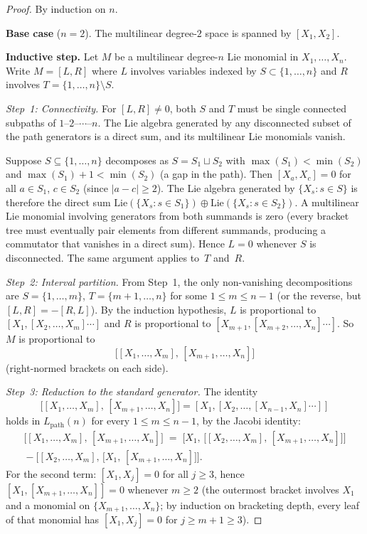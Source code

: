 \begin{proof}
By induction on $n$.

\medskip\noindent\textbf{Base case} ($n=2$).
The multilinear degree-$2$ space is spanned by $[X_1,X_2]$.

\medskip\noindent\textbf{Inductive step.}
Let $M$ be a multilinear degree-$n$ Lie monomial in $X_1,\ldots,X_n$.
Write $M=[L,R]$ where $L$ involves variables indexed by $S\subset
\{1,\ldots,n\}$ and $R$ involves $T=\{1,\ldots,n\}\setminus S$.

\emph{Step~1: Connectivity.}
For $[L,R]\neq 0$, both $S$ and $T$ must be single connected subpaths
of $1\text{--}2\text{--}\cdots\text{--}n$. The Lie algebra generated by
any disconnected subset of the path generators is a direct sum, and its
multilinear Lie monomials vanish.

Suppose $S\subseteq\{1,\ldots,n\}$ decomposes as $S=S_1\sqcup S_2$
with $\max(S_1)<\min(S_2)$ and $\max(S_1)+1<\min(S_2)$ (a gap in the
path). Then $[X_a,X_c]=0$ for all $a\in S_1$, $c\in S_2$ (since
$|a-c|\ge 2$). The Lie algebra generated by $\{X_s:s\in S\}$ is
therefore the direct sum
$\mathrm{Lie}(\{X_s:s\in S_1\})\oplus\mathrm{Lie}(\{X_s:s\in S_2\})$.
A multilinear Lie monomial involving generators from both summands is
zero (every bracket tree must eventually pair elements from different
summands, producing a commutator that vanishes in a direct sum).
Hence $L=0$ whenever $S$ is disconnected. The same argument
applies to~$T$ and~$R$.

\emph{Step~2: Interval partition.}
From Step~1, the only non-vanishing decompositions are
$S=\{1,\ldots,m\}$, $T=\{m{+}1,\ldots,n\}$ for some $1\le m\le n-1$
(or the reverse, but $[L,R]=-[R,L]$). By the induction hypothesis,
$L$ is proportional to $[X_1,[X_2,\ldots,X_m]\cdots]$ and $R$ is
proportional to $[X_{m+1},[X_{m+2},\ldots,X_n]\cdots]$. So
$M$ is proportional to
\[
\bigl[[X_1,\ldots,X_m],\,[X_{m+1},\ldots,X_n]\bigr]
\]
(right-normed brackets on each side).

\emph{Step~3: Reduction to the standard generator.}
The identity
\[
\bigl[[X_1,\ldots,X_m],\,[X_{m+1},\ldots,X_n]\bigr]
=
[X_1,[X_2,\ldots,[X_{n-1},X_n]\cdots]]
\]
holds in $L_{\mathrm{path}}(n)$ for every $1\le m\le n-1$, by the
Jacobi identity:
\begin{multline*}
\bigl[[X_1,\ldots,X_m],\,[X_{m+1},\ldots,X_n]\bigr]
\;=\;
\bigl[X_1,\,\bigl[[X_2,\ldots,X_m],\,[X_{m+1},\ldots,X_n]\bigr]\bigr]\\
{}-
\bigl[[X_2,\ldots,X_m],\,\bigl[X_1,\,[X_{m+1},\ldots,X_n]\bigr]\bigr].
\end{multline*}
For the second term: $[X_1,X_j]=0$ for all $j\ge 3$, hence
$[X_1,[X_{m+1},\ldots,X_n]]=0$ whenever $m\ge 2$ (the outermost
bracket involves $X_1$ and a monomial on $\{X_{m+1},\ldots,X_n\}$;
by induction on bracketing depth, every leaf of that monomial has
$[X_1,X_j]=0$ for $j\ge m+1\ge 3$).


\end{proof}
